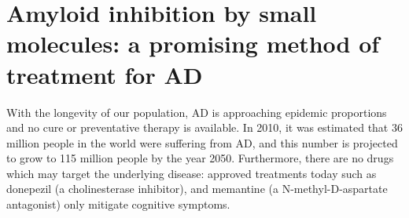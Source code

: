 



\section{Amyloid inhibition by small molecules: a promising method of treatment for AD} 

With the longevity of our population, AD is approaching epidemic proportions and no cure or preventative therapy is available.\cite{Blennow:2006wd} In 2010, it was estimated that 36 million people in the world were suffering from AD, and this number is projected to grow to 115 million people by the year 2050.\cite{alzreport:2012} Furthermore, there are no drugs which may target the underlying disease: approved treatments today such as donepezil (a cholinesterase inhibitor), and memantine (a N-methyl-D-aspartate antagonist) only mitigate cognitive symptoms.\cite{Mangialasche:2010eg}


